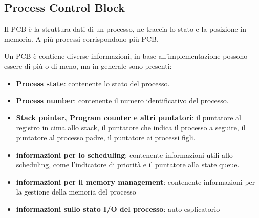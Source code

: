 \documentclass{article}
\begin{document}
    \subsection{Process Control Block}

        \begin{tcolorbox}[colback= green!10!white, colframe= green!40!black, title=Program Control Block]
            Il PCB è la struttura dati di un processo, ne traccia lo stato e la posizione in memoria.
            A più processi corrispondono più PCB.
        \end{tcolorbox}
        Un PCB è contiene diverse informazioni, in base all'implementazione possono essere di più o di meno, ma in generale sono presenti:
        \begin{itemize}
            \item \textbf{Process state}:
                contenente lo stato del processo.
            \item \textbf{Process number}:
                contenente il numero identificativo del processo.
            \item \textbf{Stack pointer, Program counter e altri puntatori}:
                il puntatore al registro in cima allo stack, il puntatore che indica il processo a seguire, il puntatore al processo padre, il puntatore ai processi figli.
            \item \textbf{informazioni per lo scheduling}:
                contenente informazioni utili allo scheduling, come l'indicatore di priorità e il puntatore alla state queue.
            \item \textbf{informazioni per il memory management}:
                contenente informazioni per la gestione della memoria del processo
            \item \textbf{informazioni sullo stato I/O del processo}:
                auto esplicatorio
        
        \end{itemize}
\end{document}
